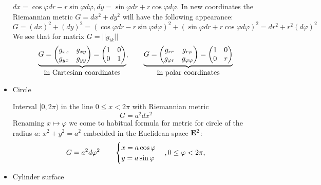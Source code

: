 \documentclass[12pt]{article}
\theoremstyle{theorem}
\numberwithin{equation}{section}
\begin{document}
\begin{itemize}
   $dx=\cos\varphi dr-r\sin\varphi d\varphi, dy=\sin\varphi dr+r\cos\varphi d\varphi$.
  In new coordinates the Riemannian metric $G=dx^2+dy^2$ will
have the following appearance:
             $$
        G=(dx)^2+(dy)^2=(\cos\varphi dr-r\sin\varphi d\varphi)^2+(\sin\varphi dr+r\cos\varphi d\varphi)^2=
         dr^2+r^2(d\varphi)^2
            $$
   We see that for matrix    $G=||g_{ik}||$
             \begin{equation*}
                 \underbrace{G=
           \begin{pmatrix}        g_{xx} &g_{xy}\cr  g_{yx} &g_{yy} \end{pmatrix}=
      \begin{pmatrix}    1 &0\cr  0 &1\cr
\end{pmatrix}}_{\hbox{in Cartesian coordinates}},\qquad
                 \underbrace
                 {G=
      \begin{pmatrix}g_{rr} &g_{r\varphi}\cr g_{\varphi r}
&g_{\varphi\varphi}\end{pmatrix}=
      \begin{pmatrix}1 &0\cr 0 &r\end{pmatrix}}_ {\hbox{in polar coordinates}}
             \end{equation*}



    \item   Circle

     Interval $[0,2\pi)$ in the line $0\leq x< 2\pi$ with Riemannian  metric
           \begin{equation}\label{circle1}
          G=  a^2dx^2
           \end{equation}
Renaming $x\mapsto \varphi $ we come to habitual formula for
metric
for circle of the radius $a$: $x^2+y^2=a^2$ embedded in
the Euclidean space ${\bf E}^2$:
           \begin{equation}\label{circle2}
          G= a^2d\varphi^2\qquad
          \begin{cases}
          x=a\cos\varphi\cr
          y=a\sin\varphi
          \end {cases},
          0\leq \varphi <2\pi,
           \end{equation}




    \item Cylinder surface


\end{itemize}
\end{document}
